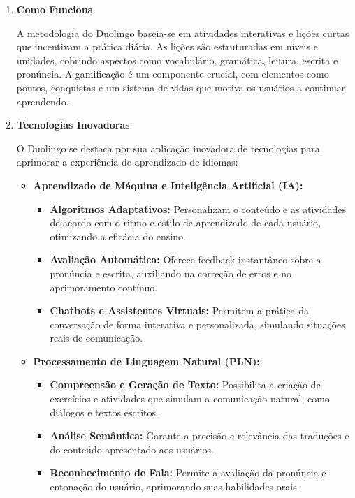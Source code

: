 \begin{enumerate}
    \item \textbf{Como Funciona}
    
    A metodologia do Duolingo baseia-se em atividades interativas e lições curtas que incentivam a prática diária. As lições são estruturadas em níveis e unidades, cobrindo aspectos como vocabulário, gramática, leitura, escrita e pronúncia. A gamificação é um componente crucial, com elementos como pontos, conquistas e um sistema de vidas que motiva os usuários a continuar aprendendo.

    \item \textbf{Tecnologias Inovadoras}

    O Duolingo se destaca por sua aplicação inovadora de tecnologias para aprimorar a experiência de aprendizado de idiomas:

    \begin{itemize}
        \item \textbf{Aprendizado de Máquina e Inteligência Artificial (IA):}
        \begin{itemize}
            \item \textbf{Algoritmos Adaptativos:} Personalizam o conteúdo e as atividades de acordo com o ritmo e estilo de aprendizado de cada usuário, otimizando a eficácia do ensino.
            \item \textbf{Avaliação Automática:} Oferece feedback instantâneo sobre a pronúncia e escrita, auxiliando na correção de erros e no aprimoramento contínuo.
            \item \textbf{Chatbots e Assistentes Virtuais:} Permitem a prática da conversação de forma interativa e personalizada, simulando situações reais de comunicação.
        \end{itemize}
        
        \item \textbf{Processamento de Linguagem Natural (PLN):}
        \begin{itemize}
            \item \textbf{Compreensão e Geração de Texto:} Possibilita a criação de exercícios e atividades que simulam a comunicação natural, como diálogos e textos escritos.
            \item \textbf{Análise Semântica:} Garante a precisão e relevância das traduções e do conteúdo apresentado aos usuários.
            \item \textbf{Reconhecimento de Fala:} Permite a avaliação da pronúncia e entonação do usuário, aprimorando suas habilidades orais.
        \end{itemize}


\end{itemize}
\end{enumerate}
